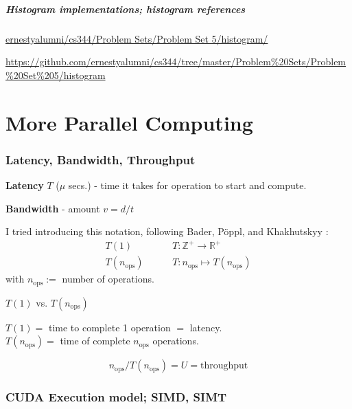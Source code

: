 \documentclass[10pt]{amsart}
\begin{document}
\begin{multicols*}{2}
\subsubsection{Histogram implementations; histogram references}

\href{https://github.com/ernestyalumni/cs344/tree/master/Problem%20Sets/Problem%20Set%205/histogram}{ernestyalumni/cs344/Problem Sets/Problem Set 5/histogram/}

  \url{https://github.com/ernestyalumni/cs344/tree/master/Problem%20Sets/Problem%20Set%205/histogram}










\part{More Parallel Computing}

\section{Latency, Bandwidth, Throughput}

\textbf{Latency} $T$ ($\mu$ secs.) - time it takes for operation to start and compute.   

\textbf{Bandwidth} - amount $v=d/t$

I tried introducing this notation, following Bader, P\"{o}ppl, and Khakhutskyy \cite{BaPK2016}  
: \[
\begin{aligned}
T(1) & \qquad \, T:\mathbb{Z}^+ \to \mathbb{R}^+ \\
T(n_{\text{ops}}) & \qquad \, T: n_{\text{ops}} \mapsto T(n_{\text{ops}})
\end{aligned}
\]
with $n_{\text{ops}} := $ number of operations.  

$T(1)$ vs. $T(n_{\text{ops}})$  

$T(1) = $ time to complete 1 operation $= $ latency.  \\
$T(n_{\text{ops}}) = $ time of complete $n_{\text{ops}}$ operations. 

\begin{equation}
n_{\text{ops}} / T(n_{\text{ops}}) = U = \text{throughput}
\end{equation}



\section{CUDA Execution model; SIMD, SIMT}



\end{multicols*}
\end{document}
